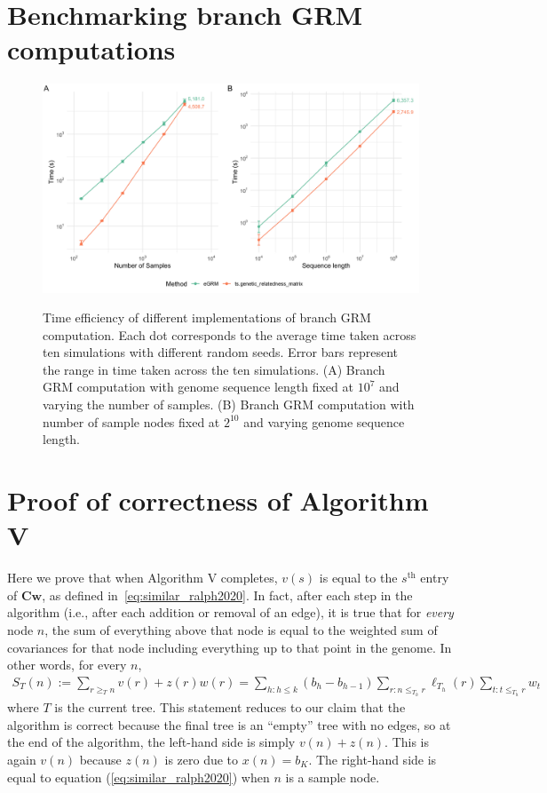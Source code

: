 \section{Benchmarking branch GRM computations} \label{sec:grm_benchmarking}

\begin{figure}[h!]
    \centering
    \includegraphics[width=\textwidth]{Figures/SIFig_benchmarking_plot.png}
    \label{fig:SI_benchmarking}
    \caption{Time efficiency of different implementations of branch GRM computation.
    Each dot corresponds to the average time taken across ten simulations with different random seeds.
    Error bars represent the range in time taken across the ten simulations.
    (A) Branch GRM computation with genome sequence length fixed at $10^{7}$ and varying the number of samples.
    (B) Branch GRM computation with number of sample nodes fixed at $2^{10}$ and varying genome sequence length.}
\end{figure}

\section{Proof of correctness of Algorithm V}\label{sec:proof-algv-correct}

Here we prove that when Algorithm V completes, $v(s)$ is equal to the
$s^{\text{th}}$ entry of $\mathbf{C}\mathbf{w}$, as defined
in~\eqref{eq:similar_ralph2020}.
In fact, after each step in the algorithm (i.e., after each addition or removal of an edge), 
it is true that for \textit{every} node $n$, the sum of everything above that node is equal to the weighted sum of covariances
for that node including everything up to that point in the genome.
In other words, for every $n$,
\begin{align} \label{eqn:matvec_consistent}
    S_T(n):=
    \sum_{r \ge_T n} v(r) + z(r)w(r) 
    = 
    \sum_{h:h \le k} (b_h-b_{h-1}) \sum_{r:n \le_{T_h} r} \ell_{T_h}(r) \sum_{t: t \le_{T_h} r} w_t
\end{align}
where $T$ is the current tree.
This statement reduces to our claim that the algorithm is correct because
the final tree is an ``empty'' tree with no edges,
so at the end of the algorithm, the left-hand side is simply $v(n)+z(n)$.
This is again $v(n)$ because $z(n)$ is zero due to $x(n)=b_K$.
The right-hand side is equal to equation 
(\ref{eq:similar_ralph2020}) when $n$ is a sample node.

